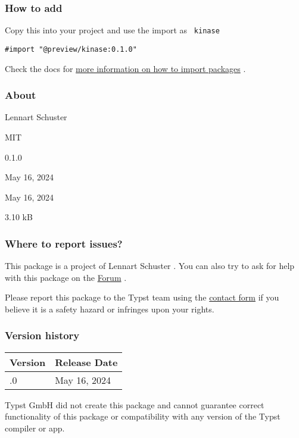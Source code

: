 \subsubsection{How to add}\label{how-to-add}

Copy this into your project and use the import as \texttt{\ kinase\ }

\begin{verbatim}
#import "@preview/kinase:0.1.0"
\end{verbatim}



Check the docs for
\href{https://typst.app/docs/reference/scripting/\#packages}{more
information on how to import packages} .

\subsubsection{About}\label{about}

\begin{description}
\tightlist
\item[Author :]
Lennart Schuster
\item[License:]
MIT
\item[Current version:]
0.1.0
\item[Last updated:]
May 16, 2024
\item[First released:]
May 16, 2024
\item[Archive size:]
3.10 kB
\href{https://packages.typst.org/preview/kinase-0.1.0.tar.gz}{\pandocbounded{}}
\end{description}

\subsubsection{Where to report issues?}\label{where-to-report-issues}

This package is a project of Lennart Schuster . You can also try to ask
for help with this package on the \href{https://forum.typst.app}{Forum}
.

Please report this package to the Typst team using the
\href{https://typst.app/contact}{contact form} if you believe it is a
safety hazard or infringes upon your rights.

\label{versions}
\subsubsection{Version history}\label{version-history}

\begin{longtable}[]{@{}ll@{}}
\toprule\noalign{}
Version & Release Date \\
\midrule\noalign{}
\endhead
\bottomrule\noalign{}
\endlastfoot
0.1.0 & May 16, 2024 \\
\end{longtable}

Typst GmbH did not create this package and cannot guarantee correct
functionality of this package or compatibility with any version of the
Typst compiler or app.
